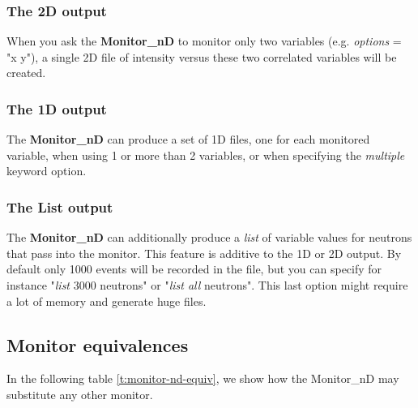 \subsubsection{The 2D output}

When you ask the \textbf{Monitor\_nD} to monitor only two variables (e.g.
\textit{options} = "x y"), a single 2D file of intensity versus these two
correlated variables will be created.

\subsubsection{The 1D output}

The \textbf{Monitor\_nD} can produce a set of 1D files, one for each
monitored variable, when using 1 or more than 2 variables, or when
specifying the \textit{multiple} keyword option.

\subsubsection{The List output}

The \textbf{Monitor\_nD} can additionally produce a \textit{list} of variable
values for neutrons that pass into the monitor. This feature is additive
to the 1D or 2D output. By default only 1000 events will be recorded in
the file, but you can specify for instance "\textit{list} 3000 neutrons" or
"\textit{list all} neutrons". This last option might require a lot of
memory and generate huge files.

\subsection{Monitor equivalences}

In the following table \ref{t:monitor-nd-equiv}, we show how the Monitor\_nD may substitute any other \MCS monitor.

